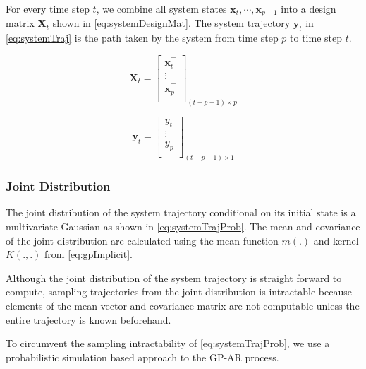 For every time step $t$, we combine all system states $\mathbf{x}_t, \cdots, \mathbf{x}_{p-1}$ into a design matrix 
$\mathbf{X}_t$ shown in \cref{eq:systemDesignMat}. The system trajectory $\mathbf{y}_t$ in \cref{eq:systemTraj} is the 
path taken by the system from time step $p$ to time step $t$.

\begin{equation}\label{eq:systemDesignMat}
    \mathbf{X}_t = \begin{bmatrix}
        \mathbf{x}^{\intercal}_{t}\\ 
        \vdots\\ 
        \mathbf{x}^{\intercal}_{p}\\ 
        \end{bmatrix}_{(t-p+1) \times p}
\end{equation}

\begin{equation}\label{eq:systemTraj}
    \mathbf{y}_t = \begin{bmatrix}
        y_{t}\\ 
        \vdots\\ 
        y_{p}\\ 
        \end{bmatrix}_{(t-p+1) \times 1}
\end{equation}

\subsubsection*{Joint Distribution}

The joint distribution of the system trajectory conditional on its initial state is a multivariate Gaussian 
as shown in \cref{eq:systemTrajProb}. The mean and covariance of the joint distribution are calculated using the 
mean function $m(.)$ and kernel $K(., .)$ from \cref{eq:gpImplicit}. 

Although the joint distribution of the system trajectory is straight forward to compute, sampling trajectories from 
the joint distribution is intractable because elements of the mean vector and covariance matrix are not computable 
unless the entire trajectory is known beforehand. 

To circumvent the sampling intractability of \cref{eq:systemTrajProb}, we use a probabilistic simulation based approach 
to the GP-AR process.

